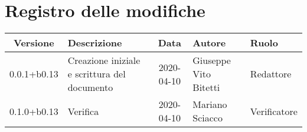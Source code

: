 \section*{Registro delle modifiche}

\begin{center}
	\begin{longtable}{|c|p{3.5cm}|c|p{3cm}|p{3cm}|}
	\hline
	\rowcolor{lighter-grayer}
	\textbf{Versione} & \textbf{Descrizione} & \textbf{Data} & \textbf{Autore} & \textbf{Ruolo} \\
	\hline
	\endfirsthead


	0.0.1+b0.13 & Creazione iniziale e scrittura del documento & 2020-04-10 & Giuseppe Vito Bitetti & Redattore \\
	\hline
	0.1.0+b0.13 & Verifica & 2020-04-10 & Mariano Sciacco & Verificatore \\
	\hline

	\end{longtable}
\end{center}
